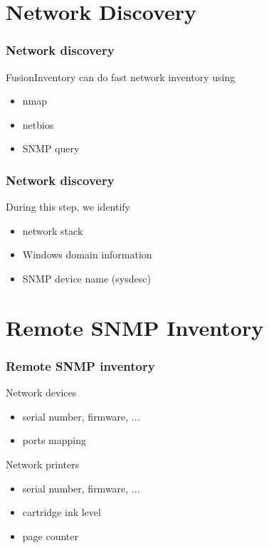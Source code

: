\documentclass{beamer}
\begin{document}
\section{Network Discovery}

\begin{frame}
    \frametitle{Network discovery}

    \begin{block}{FusionInventory can do fast network inventory using}
    \begin{itemize}
      \item nmap
      \item netbios
      \item SNMP query
    \end{itemize}
    \end{block}

\end{frame}

\begin{frame}
    \frametitle{Network discovery}

    \begin{block}{During this step, we identify}
    \begin{itemize}
        \item network stack
        \item Windows domain information
        \item SNMP device name (sysdesc)
    \end{itemize}
    \end{block}
\end{frame}

\section{Remote SNMP Inventory}
\begin{frame}
    \frametitle{Remote SNMP inventory}

    \begin{block}{Network devices}
        \begin{itemize}
            \item serial number, firmware, ...
            \item ports mapping
        \end{itemize}
    \end{block}

    \begin{block}{Network printers}
        \begin{itemize}
            \item serial number, firmware, ...
            \item cartridge ink level
            \item page counter
        \end{itemize}
    \end{block}
\end{frame}
\end{document}
